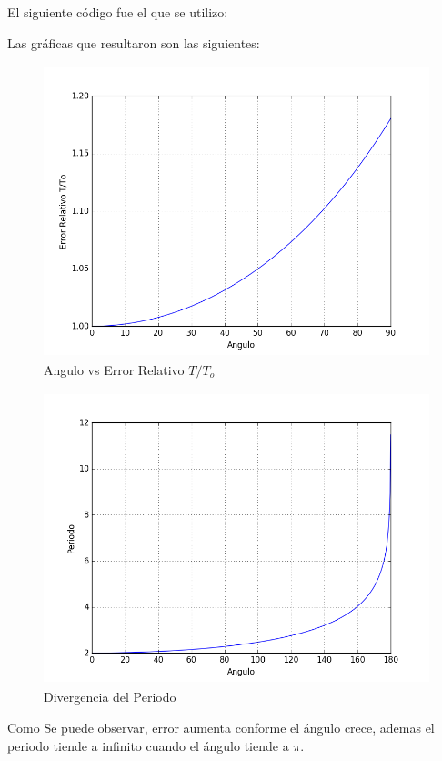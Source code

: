\documentclass[12pt]{article}
\begin{document}
El siguiente código fue el que se utilizo:

\pagebreak
Las gráficas que resultaron son las siguientes:
\begin{figure}[H]
\centering
\includegraphics[width=15cm,height=8.5cm]{Error.png}
\caption{Angulo vs Error Relativo $T/T_o$}
\end{figure}
\begin{figure}[H]
\centering
\includegraphics[width=15cm,height=8.5cm]{Divergencia.png}
\caption{Divergencia del Periodo}
\end{figure}
Como Se puede observar, error aumenta conforme el ángulo crece, ademas el periodo tiende a infinito cuando el ángulo tiende a $\pi$.
\end{document}
